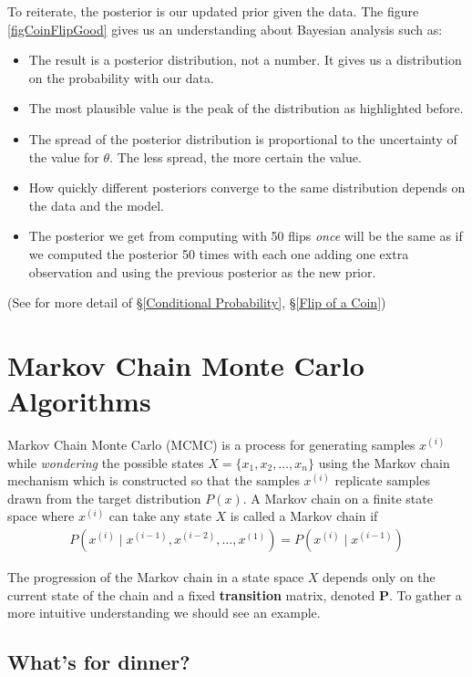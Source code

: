 \documentclass[12pt,twoside]{report}   %
\begin{document}
To reiterate, the posterior is our updated prior given the data. The figure \ref{figCoinFlipGood} gives us an understanding about Bayesian analysis such as:
\begin{itemize}
\item The result is a posterior distribution, not a number. It gives us a distribution on the probability with our data.
\item The most plausible value is the peak of the distribution as highlighted before.
\item The spread of the posterior distribution is proportional to the uncertainty of the value for $\theta$. The less spread, the more certain the value.
\item How quickly different posteriors converge to the same distribution depends on the data and the model.
\item The posterior we get from computing with 50 flips \textit{once} will be the same as if we computed the posterior 50 times with each one adding one extra observation and using the previous posterior as the new prior.
\end{itemize}
(See \cite{2} for more detail of \S\ref{Conditional Probability}, \S\ref{Flip of a Coin})

\chapter{Markov Chain Monte Carlo Algorithms}\label{MCMC}

Markov Chain Monte Carlo (MCMC) is a process for generating samples $x^{(i)}$ while \textit{wondering} the possible states $X = \{x_1,x_2,\ldots,x_n\}$ using the Markov chain mechanism which is constructed so that the samples $x^{(i)}$ replicate samples drawn from the target distribution $P(x)$. A Markov chain on a finite state space where $x^{(i)}$ can take any state $X$ is called a Markov chain if 
\begin{align}\label{Markov Chain Def}
P(x^{(i)}\mid x^{(i-1)},x^{(i-2)},\ldots,x^{(1)}) = P(x^{(i)}\mid x^{(i-1)})
\end{align}

The progression of the Markov chain in a state space $X$ depends only on the current state of the chain and a fixed \textbf{transition} matrix, denoted \textbf{P}. To gather a more intuitive understanding we should see an example.

\section{What's for dinner?}\label{What's for Dinner}
\end{document}
